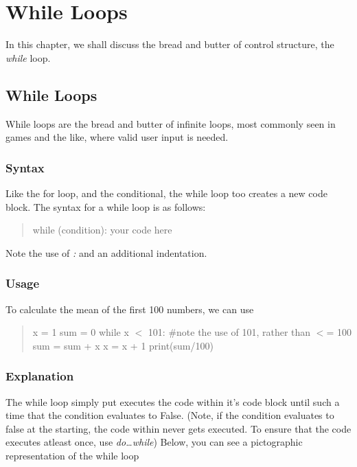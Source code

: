 \chapter{While Loops}
In this chapter, we shall discuss the bread and butter of control structure, the \emph{while} loop. 
\section{While Loops}
While loops are the bread and butter of infinite loops, most commonly seen in games and the like, where valid user input is needed.
\subsection{Syntax}
Like the for loop, and the conditional, the while loop too creates a new code block.
The syntax for a while loop is as follows:
\begin{quote}
while (condition): \newline
\tab \textlangle{}your code here\textrangle{}
\end{quote}
Note the use of \emph{:} and an additional indentation.

\subsection{Usage}
To calculate the mean of the first 100 numbers, we can use
\begin{quote}
x = 1 \newline
sum = 0 \newline
while x $<$ 101: $\#$note the use of 101, rather than $<$= 100 \newline
\tab sum = sum + x \newline
\tab x = x + 1 \newline
print(sum/100)
\end{quote}

\subsection{Explanation}
The while loop simply put executes the code within it's code block until such a time that the condition evaluates to False. (Note, if the condition evaluates to false at the starting, the code within never gets executed. To ensure that the code executes atleast once, use \emph{do…while})\newline
Below, you can see a pictographic representation of the while loop\newline \newline
 \newline

